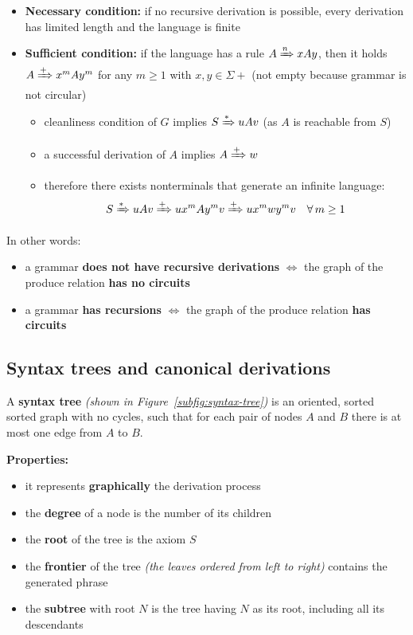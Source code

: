 \documentclass[english]{article}
\begin{document}
\begin{itemize}
  \item \textbf{Necessary condition:} if no recursive derivation is possible, every derivation has limited length and the language is finite
  \item \textbf{Sufficient condition:} if the language has a rule \(A \xRightarrow{n} x A y\), then it holds \(A \xRightarrow{+} x^m A y^m\) for any \(m \geq 1\) with \(x, y \in \Sigma+\) (not empty because grammar is not circular)
        \begin{itemize}
          \item cleanliness condition of \(G\) implies \(S \xRightarrow{\ast} uAv\) (as \(A\) is reachable from \(S\))
          \item a successful derivation of \(A\) implies \(A \xRightarrow{+} w\)
          \item therefore there exists nonterminals that generate an infinite language:
                \[ S \xRightarrow{\ast} uAv \xRightarrow{+}ux^m Ay^m v \xRightarrow{+} u x^m w y^m v \quad \forall \, m \geq 1 \]
        \end{itemize}
\end{itemize}

\bigskip
In other words:

\begin{itemize}
  \item a grammar \textbf{does not have recursive derivations} \(\Longleftrightarrow\) the graph of the produce relation \textbf{has no circuits}
  \item a grammar \textbf{has recursions} \(\Longleftrightarrow\) the graph of the produce relation \textbf{has circuits}
\end{itemize}

\subsection{Syntax trees and canonical derivations}

A \textbf{syntax tree} \textit{(shown in Figure~\ref{subfig:syntax-tree})} is an oriented, sorted sorted graph with no cycles, such that for each pair of nodes \(A\) and \(B\) there is at most one edge from \(A\) to \(B\).

\bigskip
\textbf{Properties:}

\begin{itemize}
  \item it represents \textbf{graphically} the derivation process
  \item the \textbf{degree} of a node is the number of its children
  \item the \textbf{root} of the tree is the axiom \(S\)
  \item the \textbf{frontier} of the tree \textit{(the leaves ordered from left to right)} contains the generated phrase
  \item the \textbf{subtree} with root \(N\) is the tree having \(N\) as its root, including all its descendants
\end{itemize}
\end{document}

